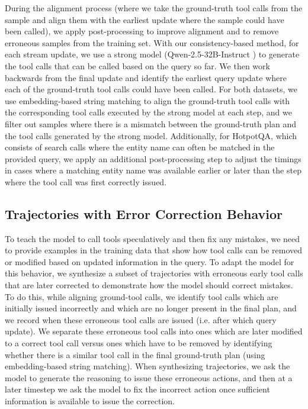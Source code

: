 During the alignment process (where we take the ground-truth tool calls from the sample and align them with the earliest update where the sample could have been called), we apply post-processing to improve alignment and to remove erroneous samples from the training set. 
With our consistency-based method, for each stream update, we use a strong model (Qwen-2.5-32B-Instruct \citep{qwen2.5}) to generate the tool calls that can be called based on the query so far.
We then work backwards from the final update and identify the earliest query update where each of the ground-truth tool calls could have been called.
For both datasets, we use embedding-based string matching to align the ground-truth tool calls with the corresponding tool calls executed by the strong model at each step, and we filter out samples where there is a mismatch between the ground-truth plan and the tool calls generated by the strong model.
Additionally, for HotpotQA, which consists of search calls where the entity name can often be matched in the provided query, we apply an additional post-processing step to adjust the timings in cases where a matching entity name was available earlier or later than the step where the tool call was first correctly issued. 

\subsection{Trajectories with Error Correction Behavior}

To teach the model to call tools speculatively and then fix any mistakes, we need to provide examples in the training data that show how tool calls can be removed or modified based on updated information in the query. 
To adapt the model for this behavior, we synthesize a subset of trajectories with erroneous early tool calls that are later corrected to demonstrate how the model should correct mistakes.
To do this, while aligning ground-tool calls, we identify tool calls which are initially issued incorrectly and which are no longer present in the final plan, and we record when these erroneous tool calls are issued (i.e. after which query update).
We separate these erroneous tool calls into ones which are later modified to a correct tool call versus ones which have to be removed by identifying whether there is a similar tool call in the final ground-truth plan (using embedding-based string matching).
When synthesizing trajectories, we ask the model to generate the reasoning to issue these erroneous actions, and then at a later timestep we ask the model to fix the incorrect action once sufficient information is available to issue the correction.



